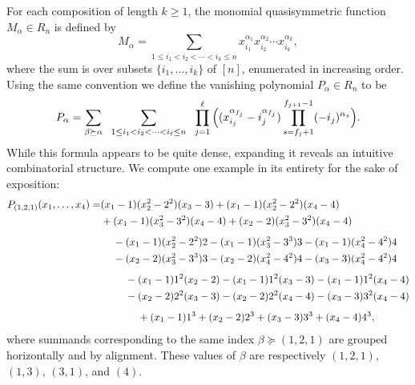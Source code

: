 \documentclass[submission]{FPSAC2024}
\newtheorem{prop}[equation]{Proposition}
\theoremstyle{definition}
\theoremstyle{remark}
\numberwithin{equation}{section}
\begin{document}
For each composition of length $k \ge 1$, the monomial quasisymmetric function $M_{\alpha} \in R_{n}$ is defined by
\[
M_{\alpha} = \sum_{1\le i_1<i_2<\cdots<i_k\le n} x_{i_1}^{\alpha_1} x_{i_2}^{\alpha_2}\cdots  x_{i_k}^{\alpha_k},
\]
where the sum is over subsets $\{i_{1}, \ldots, i_{k}\}$ of $[n]$, enumerated in increasing order.  Using the same convention we define the vanishing polynomial $P_{\alpha} \in R_{n}$ to be
\[
P_{\alpha} =  
\sum_{\beta \succeq \alpha}
\hspace{0.6em}
\sum_{1\le i_{1} < i_{2} < \cdots < i_{\ell} \le n} 
\hspace{0.6em}
\prod_{j = 1}^{\ell}
\Big(
(x_{i_{j}}^{\alpha_{f_{j}}} - i_{j}^{\alpha_{f_{j}}}) 
\prod_{s = f_{j} + 1}^{f_{j+1} - 1} (- i_{j})^{\alpha_{s}}
\Big).
\]
While this formula appears to be quite dense, expanding it reveals an intuitive combinatorial structure.  We compute one example in its entirety for the sake of exposition: 
\begin{align*}
P_{(1, 2, 1)}(x_{1}, \ldots, x_{4}) =& (x_{1} - 1)(x_{2}^{2} - 2^{2})(x_{3} - 3) + (x_{1} - 1)(x_{2}^{2} - 2^{2})(x_{4} - 4) \\
&+ (x_{1} - 1)(x_{3}^{2} - 3^{2})(x_{4} - 4) + (x_{2} - 2)(x_{3}^{2} - 3^{2})(x_{4} - 4) \\[1ex]
&\hspace{1.2em} -  (x_{1} - 1)(x_{2}^{2} - 2^{2})2 -  (x_{1} - 1)(x_{3}^{2} - 3^{3})3 -  (x_{1} - 1)(x_{4}^{2} - 4^{2})4  \\
&\hspace{1.2em} -  (x_{2} - 2)(x_{3}^{2} - 3^{3})3 -  (x_{2} - 2)(x_{4}^{2} - 4^{2})4 -  (x_{3} - 3)(x_{4}^{2} - 4^{2})4 \\[1ex]
&\hspace{2.4em} -  (x_{1} - 1)1^{2}(x_{2} - 2) -  (x_{1} - 1)1^{2}(x_{3} - 3) -  (x_{1} - 1)1^{2}(x_{4} - 4) \\
&\hspace{2.4em} -  (x_{2} - 2)2^{2}(x_{3} - 3) -  (x_{2} - 2)2^{2}(x_{4} - 4) -  (x_{3} - 3)3^{2}(x_{4} - 4) \\[1ex]
&\hspace{3.6em} + (x_{1} - 1) 1^{3} + (x_{2} - 2) 2^{3} + (x_{3} - 3) 3^{3} + (x_{4} - 4) 4^{3},
\end{align*}
where summands corresponding to the same index $\beta \succeq (1, 2, 1)$ are grouped horizontally and by alignment.  These values of $\beta$ are respectively $(1, 2, 1)$, $(1, 3)$, $(3, 1)$, and $(4)$.

\end{document}
